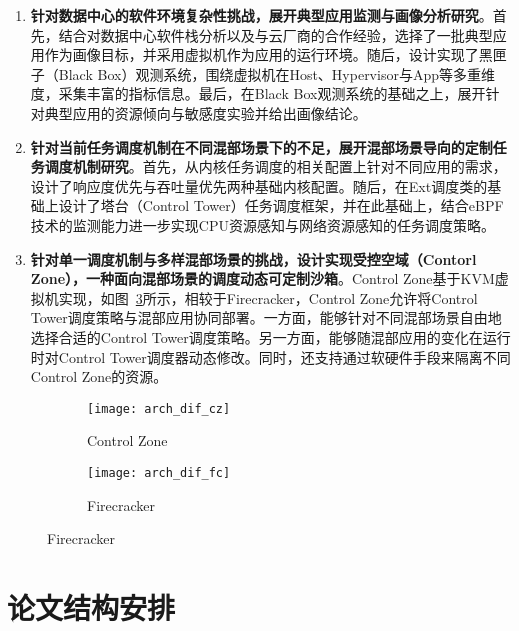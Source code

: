\begin{enumerate}

    \item \textbf{针对数据中心的软件环境复杂性挑战，展开典型应用监测与画像分析研究}。首先，结合对数据中心软件栈分析以及与云厂商的合作经验，选择了一批典型应用作为画像目标，并采用虚拟机作为应用的运行环境。随后，设计实现了黑匣子（Black Box）观测系统，围绕虚拟机在Host、Hypervisor与App等多重维度，采集丰富的指标信息。最后，在Black Box观测系统的基础之上，展开针对典型应用的资源倾向与敏感度实验并给出画像结论。

    \item \textbf{针对当前任务调度机制在不同混部场景下的不足，展开混部场景导向的定制任务调度机制研究}。首先，从内核任务调度的相关配置上针对不同应用的需求，设计了响应度优先与吞吐量优先两种基础内核配置。随后，在Ext调度类的基础上设计了塔台（Control Tower）任务调度框架，并在此基础上，结合eBPF技术的监测能力进一步实现CPU资源感知与网络资源感知的任务调度策略。

    \item \textbf{针对单一调度机制与多样混部场景的挑战，设计实现受控空域（Contorl Zone），一种面向混部场景的调度动态可定制沙箱}。Control Zone基于KVM虚拟机实现，如图~\ref{fig:arch_dif}所示，相较于Firecracker\citep{agache2020firecracker}，Control Zone允许将Control Tower调度策略与混部应用协同部署。一方面，能够针对不同混部场景自由地选择合适的Control Tower调度策略。另一方面，能够随混部应用的变化在运行时对Control Tower调度器动态修改。同时，还支持通过软硬件手段来隔离不同Control Zone的资源。

\end{enumerate}

\begin{figure}[!htbp]
    \centering
    \begin{subfigure}[b]{0.4\textwidth}
        \texttt{[image: arch\_dif\_cz]}
        \caption{Control Zone}
        \label{fig:arch_dif_cz}
    \end{subfigure}
    \hspace{0.5cm}
    \begin{subfigure}[b]{0.4\textwidth}
        \texttt{[image: arch\_dif\_fc]}
        \caption{Firecracker}
        \label{fig:arch_dif_fc}
    \end{subfigure}
\label{fig:arch_dif}
\end{figure}

\section{论文结构安排}

